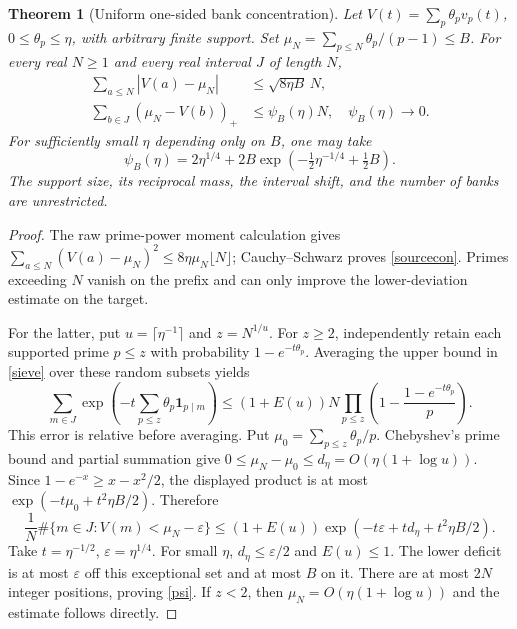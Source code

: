 \documentclass[11pt,a4paper]{article}
\newtheorem{theorem}{Theorem}[section]
\newcommand{\ind}{\mathbf 1}
\begin{document}
\begin{theorem}[Uniform one-sided bank concentration]
Let $V(t)=\sum_p\theta_pv_p(t)$, $0\le\theta_p\le\eta$, with arbitrary finite
support. Set $\mu_N=\sum_{p\le N}\theta_p/(p-1)\le B$. For every real $N\ge1$
and every real interval $J$ of length $N$,
\begin{align}
 \sum_{a\le N}|V(a)-\mu_N|&\le\sqrt{8\eta B}\,N,\label{sourcecon}\\
 \sum_{b\in J}(\mu_N-V(b))_+&\le\psi_B(\eta)N,\quad
 \psi_B(\eta)\longrightarrow0.                          \label{targetcon}
\end{align}
For sufficiently small $\eta$ depending only on $B$, one may take
\begin{equation}
 \psi_B(\eta)=2\eta^{1/4}
 +2B\exp\left(-\tfrac12\eta^{-1/4}+\tfrac12B\right).
 \label{psi}
\end{equation}
The support size, its reciprocal mass, the interval shift, and the number
of banks are unrestricted.
\end{theorem}
\begin{proof}
The raw prime-power moment calculation gives
$\sum_{a\le N}(V(a)-\mu_N)^2\le8\eta\mu_N\lfloor N\rfloor$; Cauchy--Schwarz
proves \eqref{sourcecon}. Primes exceeding $N$ vanish on the prefix and can
only improve the lower-deviation estimate on the target.

For the latter, put $u=\lceil\eta^{-1}\rceil$ and $z=N^{1/u}$. For $z\ge2$,
independently retain each supported prime $p\le z$ with probability
$1-e^{-t\theta_p}$. Averaging the upper bound in \eqref{sieve} over these
random subsets yields
\[
 \sum_{m\in J}\exp\left(-t\sum_{p\le z}\theta_p\ind_{p\mid m}\right)
 \le(1+E(u))N\prod_{p\le z}
       \left(1-\frac{1-e^{-t\theta_p}}p\right).
\]
This error is relative before averaging. Put $\mu_0=\sum_{p\le z}\theta_p/p$.
Chebyshev's prime bound and partial summation give
$0\le\mu_N-\mu_0\le d_\eta=O(\eta(1+\log u))$. Since
$1-e^{-x}\ge x-x^2/2$, the displayed product is at most
$\exp(-t\mu_0+t^2\eta B/2)$. Therefore
\[
 \frac1N\#\{m\in J:V(m)<\mu_N-\varepsilon\}
 \le(1+E(u))\exp(-t\varepsilon+td_\eta+t^2\eta B/2).
\]
Take $t=\eta^{-1/2}$, $\varepsilon=\eta^{1/4}$. For small $\eta$,
$d_\eta\le\varepsilon/2$ and $E(u)\le1$. The lower deficit is at most
$\varepsilon$ off this exceptional set and at most $B$ on it. There are
at most $2N$ integer positions, proving \eqref{psi}. If $z<2$, then
$\mu_N=O(\eta(1+\log u))$ and the estimate follows directly.
\end{proof}
\end{document}
